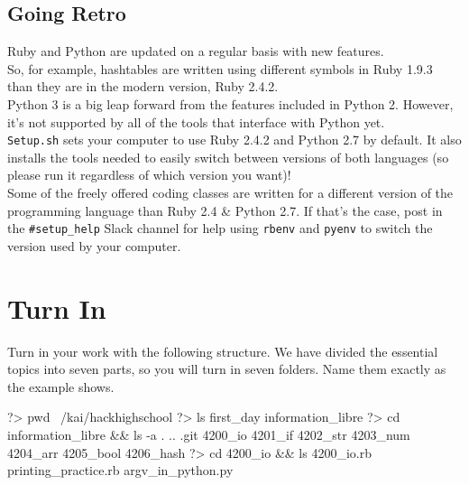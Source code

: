 \documentclass{42-en}
\begin{document}
\section{Going Retro}

Ruby and Python are updated on a regular basis with new features.\\

So, for example, hashtables are written using different symbols in Ruby 1.9.3 than they are in the modern version, Ruby 2.4.2.\\

Python 3 is a big leap forward from the features included in Python 2. However, it's not supported by all of the tools that interface with Python yet.\\

\texttt{Setup.sh} sets your computer to use Ruby 2.4.2 and Python 2.7 by default. It also installs the tools needed to easily switch between versions of both languages (so please run it regardless of which version you want)!\\

Some of the freely offered coding classes are written for a different version of the programming language than Ruby 2.4 \& Python 2.7. If that's the case, post in the \texttt{\#setup\_help} Slack channel for help using \texttt{rbenv} and \texttt{pyenv} to switch the version used by your computer.



\chapter{Turn In}

Turn in your work with the following structure. We have divided the essential topics into seven parts, so you will turn in seven folders. Name them exactly as the example shows.\\

\begin{42console}
	?> pwd
	~/kai/hackhighschool
	?> ls
	first_day
	information_libre
	?> cd information_libre && ls -a
	.
	..
	.git
	4200_io
	4201_if
	4202_str
	4203_num
	4204_arr
	4205_bool
	4206_hash
	?> cd 4200_io && ls
	4200_io.rb
	printing_practice.rb
	argv_in_python.py
\end{42console}
\end{document}
